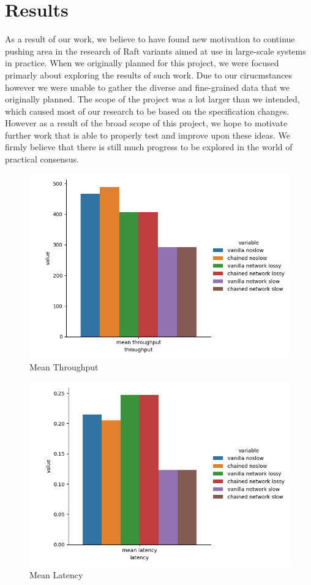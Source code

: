 \section{Results}
\label{sec:results}

As a result of our work, we believe to have found new motivation to continue pushing area in the research of Raft variants aimed at use in large-scale systems in practice.
When we originally planned for this project, we were focused primarly about exploring the results of such work. 
Due to our cirucmstances however we were unable to gather the diverse and fine-grained data that we originally planned.
The scope of the project was a lot larger than we intended, which caused most of our research to be based on the specification changes.
However as a result of the broad scope of this project, we hope to motivate further work that is able to properly test
 and improve upon these ideas. We firmly believe that there is still much progress to be explored in the world of practical consensus. 

\begin{figure}[h!]
    \includegraphics[width=\linewidth]{comparison_mean_throughput.png}
    \caption{Mean Throughput}
    \label{fig:comp_thput}
\end{figure}
\begin{figure}[h!]
    \includegraphics[width=\linewidth]{comparison_mean_latency.png}
    \caption{Mean Latency}
    \label{fig:comp_lat}
\end{figure}

